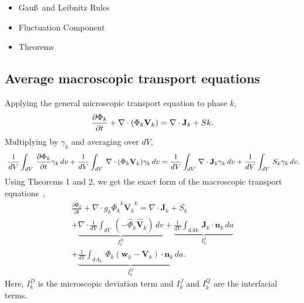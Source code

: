 \begin{itemize}
\begin{itemize}
						\begin{equation}
							\overline{\psi_{k}}^{V} = \frac{1}{V} \int_{V} \psi_{k}(\mathbf{x} + \mathbf{\eta}, t) X_{k}(\mathbf{x} + \mathbf{\eta}, t) d\mathbf{x}_{\eta},\\
						\end{equation}
						\begin{equation}
							\overline{\psi_{k}}^{k} = \frac{1}{V_{k}} \int_{V} \psi_{k}(\mathbf{x} + \mathbf{\eta}, t) X_{k}(\mathbf{x} + \mathbf{\eta}, t) d\mathbf{x}_{\eta}
						\end{equation}
				\item these averages are linearly related as, $\overline{\psi_{k}}^{V} = g_{k} \overline{\psi_{k}}^{k}$
			\end{itemize}
	\item Gau\ss~and Leibnitz Rules
	\item Fluctuation Component
	\item Theorems
\end{itemize}
\subsection{Average macroscopic transport equations}
Applying the general microscopic transport equation to phase $k$,~\newline
\begin{equation}
	\frac{\partial \Phi_{k}}{\partial t} + \nabla \cdot (\Phi_{k}\mathbf{V}_{k}) = \nabla \cdot \mathbf{J}_{k} + S{k}.\\
\end{equation}
Multiplying by $\gamma_{k}$ and averaging over $dV$,~\newline
\begin{equation}\
	\frac{1}{dV}\int_{dV}\,\frac{\partial \Phi_{k}}{\partial t}\gamma_{k}\,dv + \frac{1}{dV}\int_{dV}\,\nabla \cdot (\Phi_{k} \mathbf{V}_{k}) \gamma_{k}\,dv
		= \frac{1}{dV}\int_{dV}\,\nabla \cdot \mathbf{J}_{k} \gamma_{k}\,dv + \frac{1}{dV}\int_{dV}\,S_{k}\gamma_{k}\,dv.\\
\end{equation}
Using Theorems 1 and 2, we get the exact form of the macroscopic transport equations~\cite{bloschVolumeAveragedMacroscopicTransport1997},~\newline
\begin{multline} \label{macro_balance}
	\frac{\partial \Phi_{k}}{\partial t} + \nabla \cdot g_{k}\overline{\Phi_k}^{k} \overline{\mathbf{V}_{k}}^{k} = \nabla \cdot \overline{\mathbf{J}_{k}} + \overline{S_{k}}\\
		+ \underbrace{\nabla \cdot \frac{1}{dV}\int_{dV}\,(-\hat{\Phi}_{k} \hat{\mathbf{V}}_{k})\,dv}_{I_{k}^{D}} + \underbrace{\frac{1}{dV}\int_{dA{k}}\,\mathbf{J}_{k}\cdot\mathbf{n}_{k}\,da}_{I_{k}^{J}}\\
		+ \underbrace{\frac{1}{dV}\int_{dA_{k}}\, \Phi_{k}(\mathbf{w}_{k} - \mathbf{V}_{k}) \cdot \mathbf{n}_{k}\,da}_{I_{k}^{Q}}.
\end{multline}
Here, $I_{k}^{D}$ is the microscopic deviation term and $I_{k}^{J}$ and $I_{k}^{Q}$ are the interfacial terms.

